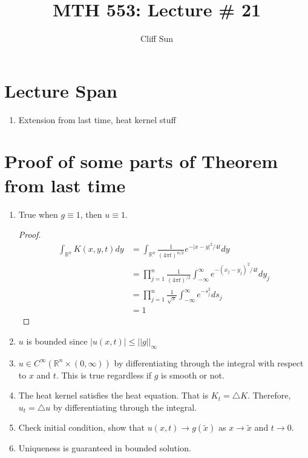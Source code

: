 \documentclass{article}
\title{MTH 553: Lecture \# 21}
\author{Cliff Sun}
\newtheorem{one minute paper}[theorem]{One Minute Paper}
\begin{document}
\maketitle

\section*{Lecture Span}
\begin{enumerate}
    \item Extension from last time, heat kernel stuff
\end{enumerate}

\section*{Proof of some parts of Theorem from last time}

\begin{enumerate}
    \item True when $g \equiv 1$, then $u \equiv 1$. 
    \begin{proof}
        \begin{align*}
            \int_{\mathbb{R}^n}K(x,y,t)dy &= \int_{\mathbb{R}^n}\frac{1}{(4\pi t)^{n/2}}e^{-|x-y|^2/4t}dy \\
            &= \prod_{j=1}^{n}\frac{1}{(4\pi t)^{/2}}\int_{-\infty}^{\infty}e^{-(x_j - y_j)^2/4t}dy_j \\
            &= \prod_{j=1}^{n}\frac{1}{\sqrt{\pi}}\int_{-\infty}^{\infty}e^{-s_j^2}ds_j \\
            &= 1
        \end{align*}
    \end{proof}
    \item $u$ is bounded since $|u(x,t)| \leq ||g||_{\infty}$
    \item $u \in C^{\infty}(\mathbb{R}^n \times (0, \infty))$ by differentiating through the integral with respect to $x$ and $t$. This is true regardless if $g$ is smooth or not. 
    \item The heat kernel satisfies the heat equation. That is $K_t = \triangle K$. Therefore, $u_t = \triangle u$ by differentiating through the integral.
    \item Check initial condition, show that $u(x,t) \rightarrow g(\tilde{x})$ as $x \rightarrow \tilde{x}$ and $t \rightarrow 0$. 
    \item Uniqueness is guaranteed in bounded solution. 
\end{enumerate}
\end{document}
